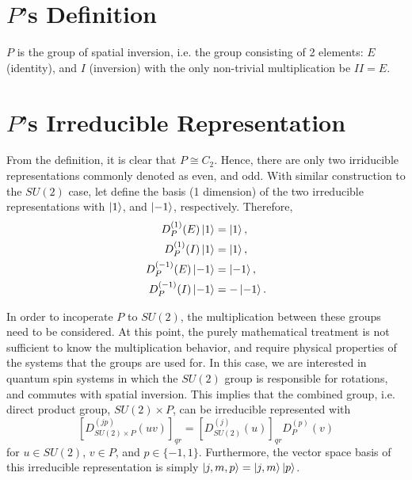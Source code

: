 \documentclass[12pt]{revtex4-2}
\begin{document}
\section{$P$'s Definition}
$P$ is the group of spatial inversion, i.e. the group consisting of 2 elements: $E$ (identity), and $I$ (inversion) with the only non-trivial multiplication be $II=E$.

\section{$P$'s Irreducible Representation}
From the definition, it is clear that $P \cong C_2$. Hence, there are only two irriducible representations commonly denoted as even, and odd. With similar construction to the $SU(2)$ case, let define the basis (1 dimension) of the two irreducible representations with $\ket{1}$, and $\ket{-1}$, respectively. Therefore, 
\begin{equation}
    \begin{aligned}
        D_P^{(1)}(E)\ket{1} &= \ket{1}, \\
        D_P^{(1)}(I)\ket{1} &= \ket{1}, \\
        D_P^{(-1)}(E)\ket{-1} &= \ket{-1}, \\
        D_P^{(-1)}(I)\ket{-1} &=-\ket{-1}.
    \end{aligned}
\end{equation}

In order to incoperate $P$ to $SU(2)$, the multiplication between these groups need to be considered. At this point, the purely mathematical treatment is not sufficient to know the multiplication behavior, and require physical properties of the systems that the groups are used for. In this case, we are interested in quantum spin systems in which the $SU(2)$ group is responsible for rotations, and commutes with spatial inversion. This implies that the combined group, i.e. direct product group, $SU(2)\times P$, can be irreducible represented with
\begin{equation}
    \left[D_{SU(2)\times P}^{(jp)}(uv)\right]_{qr} = \left[D_{SU(2)}^{(j)}(u)\right]_{qr}D_P^{(p)}(v)
\end{equation}
for $u\in SU(2)$, $v\in P$, and $p\in \{-1, 1\}$. Furthermore, the vector space basis of this irreducible representation is simply $\ket{j, m, p}=\ket{j, m}\ket{p}$.
\end{document}
